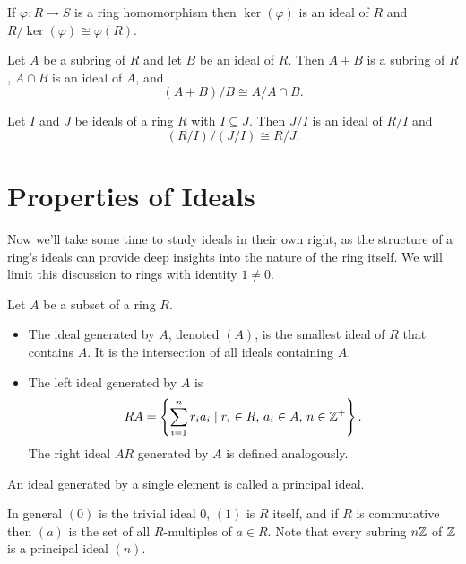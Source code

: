 \documentclass[../m171main.tex]{subfiles}
\begin{document}
\begin{theorem}
    If $\varphi : R \to S$ is a ring homomorphism then $\ker(\varphi)$ is an ideal of $R$ and $R / \ker(\varphi) \cong \varphi(R)$.
\end{theorem}

\begin{theorem}
    Let $A$ be a subring of $R$ and let $B$ be an ideal of $R$.
    Then $A+B$ is a subring of $R$, $A \cap B$ is an ideal of $A$, and
    \[ (A+B) / B \cong A / A \cap B. \]
\end{theorem}

\begin{theorem}
    Let $I$ and $J$ be ideals of a ring $R$ with $I \subseteq J$.
    Then $J / I$ is an ideal of $R / I$ and
    \[ (R / I) / (J / I) \cong R / J. \]
\end{theorem}

\section{Properties of Ideals}
Now we'll take some time to study ideals in their own right, as the structure of a ring's ideals can provide deep insights into the nature of the ring itself.
We will limit this discussion to rings with identity $1 \neq 0$.

\begin{definition}
    Let $A$ be a subset of a ring $R$.
    \begin{itemize}[topsep=0pt]
        \item The ideal generated by $A$, denoted $(A)$, is the smallest ideal of $R$ that contains $A$.
        It is the intersection of all ideals containing $A$.

        \item The left ideal generated by $A$ is
        \[ RA = \left\{ \sum_{i=1}^{n} r_i a_i \mid r_i \in R, \, a_i \in A, \, n \in \mathbb{Z}^+ \right\}. \]
        The right ideal $AR$ generated by $A$ is defined analogously.
    \end{itemize}
\end{definition}

\begin{definition}
    An ideal generated by a single element is called a principal ideal.
\end{definition}

In general $(0)$ is the trivial ideal $0$, $(1)$ is $R$ itself, and if $R$ is commutative then $(a)$ is the set of all $R$-multiples of $a \in R$.
Note that every subring $n\mathbb{Z}$ of $\mathbb{Z}$ is a principal ideal $(n)$.
\end{document}
